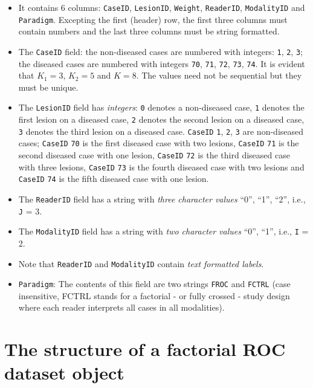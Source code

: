 \documentclass[
]{book}
\providecommand{\tightlist}{%
  \setlength{\itemsep}{0pt}\setlength{\parskip}{0pt}}
\begin{document}
\begin{itemize}
\tightlist
\item
  It contains 6 columns: \texttt{CaseID}, \texttt{LesionID}, \texttt{Weight}, \texttt{ReaderID}, \texttt{ModalityID} and \texttt{Paradigm}. Excepting the first (header) row, the first three columns must contain numbers and the last three columns must be string formatted.
\item
  The \texttt{CaseID} field: the non-diseased cases are numbered with integers: \texttt{1}, \texttt{2}, \texttt{3}; the diseased cases are numbered with integers \texttt{70}, \texttt{71}, \texttt{72}, \texttt{73}, \texttt{74}. It is evident that \(K_1 = 3\), \(K_2 = 5\) and \(K = 8\). The values need not be sequential but they must be unique.
\item
  The \texttt{LesionID} field has \emph{integers}: \texttt{0} denotes a non-diseased case, \texttt{1} denotes the first lesion on a diseased case, \texttt{2} denotes the second lesion on a diseased case, \texttt{3} denotes the third lesion on a diseased case. \texttt{CaseID} \texttt{1}, \texttt{2}, \texttt{3} are non-diseased cases; \texttt{CaseID} \texttt{70} is the first diseased case with two lesions, \texttt{CaseID} \texttt{71} is the second diseased case with one lesion, \texttt{CaseID} \texttt{72} is the third diseased case with three lesions, \texttt{CaseID} \texttt{73} is the fourth diseased case with two lesions and \texttt{CaseID} \texttt{74} is the fifth diseased case with one lesion.
\item
  The \texttt{ReaderID} field has a string with \emph{three character values} ``0'', ``1'', ``2'', i.e., \texttt{J} = 3.
\item
  The \texttt{ModalityID} field has a string with \emph{two character values} ``0'', ``1'', i.e., \texttt{I} = 2.
\item
  Note that \texttt{ReaderID} and \texttt{ModalityID} contain \emph{text formatted labels}.
\item
  \texttt{Paradigm}: The contents of this field are two strings \texttt{FROC} and \texttt{FCTRL} (case insensitive, FCTRL stands for a factorial - or fully crossed - study design where each reader interprets all cases in all modalities).
\end{itemize}

\hypertarget{dataset-object-details-structure-roc-dataset}{%
\section{The structure of a factorial ROC dataset object}\label{dataset-object-details-structure-roc-dataset}}
\end{document}
